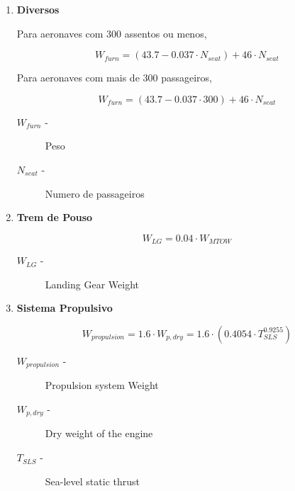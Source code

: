 \begin{enumerate}
\vspace{0.5cm}

\item \textbf{Diversos}

Para aeronaves com 300 assentos ou menos,

\begin{equation}
W_{furn} = (43.7 - 0.037 \cdot N_{seat} ) + 46 \cdot N_{seat}
\end{equation}

Para aeronaves com mais de 300 passageiros,

\begin{equation}
W_{furn} = (43.7 - 0.037 \cdot 300 ) + 46 \cdot N_{seat}
\end{equation}

\begin{description}
\item [$W_{furn}$ -] Peso
\item [$N_{seat}$ -] Numero de passageiros
\end{description}

\vspace{0.5cm}

\item \textbf{Trem de Pouso}

\begin{equation}
W_{LG} =  0.04 \cdot W_{MTOW}
\end{equation}

\begin{description}
\item [$W_{LG}$ -] Landing Gear Weight
\end{description}

\vspace{0.5cm}

\item \textbf{Sistema Propulsivo}

\begin{equation}
W_{propulsion} = 1.6 \cdot W_{p,dry} = 1.6 \cdot (0.4054 \cdot T_{SLS}^{0.9255})
\end{equation}

\begin{description}
\item [$W_{propulsion}$ -] Propulsion system Weight
\item [$W_{p,dry}$ -] Dry weight of the engine
\item [$T_{SLS}$ -] Sea-level static thrust
\end{description}

\end{enumerate}



